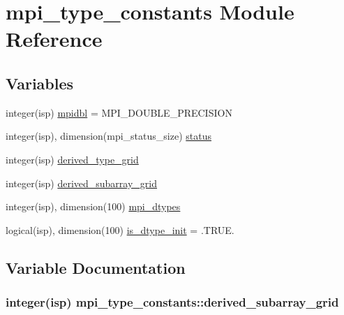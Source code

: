 \hypertarget{namespacempi__type__constants}{}\section{mpi\+\_\+type\+\_\+constants Module Reference}
\label{namespacempi__type__constants}
\subsection*{Variables}
\begin{DoxyCompactItemize}
\item 
integer(isp) \hyperlink{namespacempi__type__constants_a19270446a7b267fa3b13821e93b1744f}{mpidbl} = M\+P\+I\+\_\+\+D\+O\+U\+B\+L\+E\+\_\+\+P\+R\+E\+C\+I\+S\+I\+ON
\item 
integer(isp), dimension(mpi\+\_\+status\+\_\+size) \hyperlink{namespacempi__type__constants_a364a6ee99d8c7ba31bde4f8d2108beaa}{status}
\item 
integer(isp) \hyperlink{namespacempi__type__constants_a4463600d2b1297b8b25562589ae2ed28}{derived\+\_\+type\+\_\+grid}
\item 
integer(isp) \hyperlink{namespacempi__type__constants_ad3a88774f5b3d027503997955c593325}{derived\+\_\+subarray\+\_\+grid}
\item 
integer(isp), dimension(100) \hyperlink{namespacempi__type__constants_a17a815d34db410fbd4e9591e3a0fdd96}{mpi\+\_\+dtypes}
\item 
logical(isp), dimension(100) \hyperlink{namespacempi__type__constants_ad8671c5eb1d13c7171bfb4617dab9a38}{is\+\_\+dtype\+\_\+init} = .T\+R\+U\+E.
\end{DoxyCompactItemize}


\subsection{Variable Documentation}
\subsubsection[{\texorpdfstring{derived\+\_\+subarray\+\_\+grid}{derived_subarray_grid}}]{\setlength{\rightskip}{0pt plus 5cm}integer(isp) mpi\+\_\+type\+\_\+constants\+::derived\+\_\+subarray\+\_\+grid}\hypertarget{namespacempi__type__constants_ad3a88774f5b3d027503997955c593325}{}\label{namespacempi__type__constants_ad3a88774f5b3d027503997955c593325}
